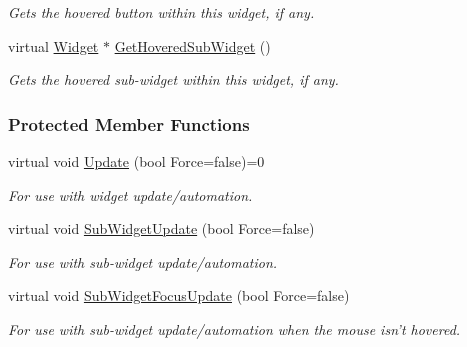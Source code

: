 \begin{DoxyCompactItemize}
\begin{DoxyCompactList}\small\item\em Gets the hovered button within this widget, if any. \item\end{DoxyCompactList}\item 
virtual \hyperlink{classphys_1_1UI_1_1Widget}{Widget} $\ast$ \hyperlink{classphys_1_1UI_1_1Widget_a38764b73bc6087e2611660735840ba3f}{GetHoveredSubWidget} ()
\begin{DoxyCompactList}\small\item\em Gets the hovered sub-\/widget within this widget, if any. \item\end{DoxyCompactList}\end{DoxyCompactItemize}
\subsubsection*{Protected Member Functions}
\begin{DoxyCompactItemize}
\item 
\hypertarget{classphys_1_1UI_1_1Widget_a1806425fcd684c2f0d50cd0ef4a6b0da}{
virtual void \hyperlink{classphys_1_1UI_1_1Widget_a1806425fcd684c2f0d50cd0ef4a6b0da}{Update} (bool Force=false)=0}
\label{d9/d48/classphys_1_1UI_1_1Widget_a1806425fcd684c2f0d50cd0ef4a6b0da}

\begin{DoxyCompactList}\small\item\em For use with widget update/automation. \item\end{DoxyCompactList}\item 
\hypertarget{classphys_1_1UI_1_1Widget_a3472e5d0f8281e704d67d419980cd918}{
virtual void \hyperlink{classphys_1_1UI_1_1Widget_a3472e5d0f8281e704d67d419980cd918}{SubWidgetUpdate} (bool Force=false)}
\label{d9/d48/classphys_1_1UI_1_1Widget_a3472e5d0f8281e704d67d419980cd918}

\begin{DoxyCompactList}\small\item\em For use with sub-\/widget update/automation. \item\end{DoxyCompactList}\item 
\hypertarget{classphys_1_1UI_1_1Widget_a4a7e18c48a7cd230fd4a0aa274c6a654}{
virtual void \hyperlink{classphys_1_1UI_1_1Widget_a4a7e18c48a7cd230fd4a0aa274c6a654}{SubWidgetFocusUpdate} (bool Force=false)}
\label{d9/d48/classphys_1_1UI_1_1Widget_a4a7e18c48a7cd230fd4a0aa274c6a654}

\begin{DoxyCompactList}\small\item\em For use with sub-\/widget update/automation when the mouse isn't hovered. \item\end{DoxyCompactList}\end{DoxyCompactItemize}
